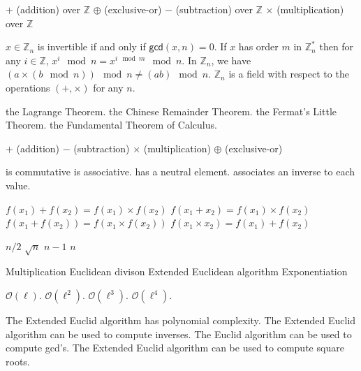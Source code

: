 {$+$ (addition) over $\mathbb{Z}$}
{$\oplus$ (exclusive-or) }
{$-$ (subtraction) over $\mathbb{Z}$}
{$\times$ (multiplication) over $\mathbb{Z}$}

 {$x \in \mathbb{Z}_n$ is invertible if and only if $\mathsf{gcd}(x,n)=0$. }
 {If $x$ has order $m$ in $\mathbb{Z}_n^*$ then for any $i \in \mathbb{Z}$, $x^i \mod n = x^{i \mod m} \mod n$.}
 {In $\mathbb{Z}_n$, we have $(a \times(b \mod n)) \mod n \neq (ab) \mod n$.}
 {$\mathbb{Z}_n$ is a field with respect to the operations $(+,\times)$ for any $n$.}
 
  {the Lagrange Theorem.}
  {the Chinese Remainder Theorem.}
  {the Fermat's Little Theorem.}
  {the Fundamental Theorem of Calculus.}
  
{$+$ (addition)}
{$-$ (subtraction)}
{$\times$ (multiplication)}
{$\oplus$ (exclusive-or)}


%
 {is commutative}%
 {is associative.}%
 {has a neutral element.}%
 {associates an inverse to each value.}%
 
 {$f(x_1) + f(x_2)=f(x_1)\times f(x_2)$}%
 {$f(x_1 + x_2)=f(x_1)\times f(x_2)$}%
 {$f(x_1 + f(x_2))=f(x_1\times f(x_2))$}%
 {$f(x_1 \times x_2)=f(x_1)+ f(x_2)$}%
 
 {$n/2$}%
 {$\sqrt{n}$}%
 {$n-1$}%
 {$n$}%
 
 {Multiplication}
 {Euclidean divison}
 {Extended Euclidean algorithm }
 {Exponentiation}

{$\mathcal{O}(\ell)$.}
{$\mathcal{O}(\ell^2)$.}
{$\mathcal{O}(\ell^3)$.}
{$\mathcal{O}(\ell^4)$.}

{The Extended Euclid algorithm has polynomial complexity.}
{The Extended Euclid algorithm can be used to compute inverses.}
{The Euclid algorithm can be used to compute gcd's.}
{The Extended Euclid algorithm can be used to compute square roots.}

